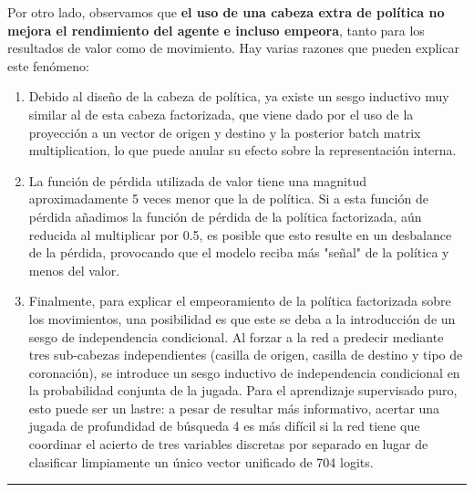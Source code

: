 \documentclass[12pt, a4paper]{article}
\begin{document}
Por otro lado, observamos que \textbf{el uso de una cabeza extra de política no mejora el rendimiento del agente e incluso empeora}, tanto para los resultados de valor como de movimiento. Hay varias razones que pueden explicar este fenómeno: 
\begin{enumerate}
    \item Debido al diseño de la cabeza de política, ya existe un sesgo inductivo muy similar al de esta cabeza factorizada, que viene dado por el uso de la proyección a un vector de origen y destino y la posterior batch matrix multiplication, lo que puede anular su efecto sobre la representación interna.
    \item La función de pérdida utilizada de valor tiene una magnitud aproximadamente 5 veces menor que la de política. Si a esta función de pérdida añadimos la función de pérdida de la política factorizada, aún reducida al multiplicar por 0.5, es posible que esto resulte en un desbalance de la pérdida, provocando que el modelo reciba más "señal" de la política y menos del valor.
    \item Finalmente, para explicar el empeoramiento de la política factorizada sobre los movimientos, una posibilidad es que este se deba a la introducción de un sesgo de independencia condicional. Al forzar a la red a predecir mediante tres sub-cabezas independientes (casilla de origen, casilla de destino y tipo de coronación), se introduce un sesgo inductivo de independencia condicional en la probabilidad conjunta de la jugada. 
    Para el aprendizaje supervisado puro, esto puede ser un lastre: a pesar de resultar más informativo, acertar una jugada de profundidad de búsqueda 4 es más difícil si la red tiene que coordinar el acierto de tres variables discretas por separado en lugar de clasificar limpiamente un único vector unificado de 704 logits.
\end{enumerate}

\rule{\textwidth}{0.2pt}
\end{document}
